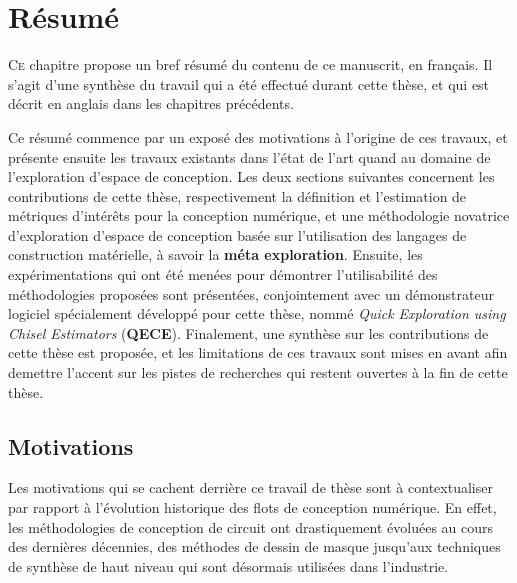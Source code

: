 \chapter{R\'esum\'e}


\lettrine[lines=2]{C}{e} chapitre propose un bref résumé du contenu de ce manuscrit, en français.
Il s'agit d'une synthèse du travail qui a été effectué durant cette thèse, et qui est décrit en anglais dans les chapitres précédents.

Ce résumé commence par un exposé des motivations à l'origine de ces travaux, et présente ensuite les travaux existants dans l'état de l'art quand au domaine de l'exploration d'espace de conception.
Les deux sections suivantes concernent les contributions de cette thèse, respectivement la définition et l'estimation de métriques d'intérêts pour la conception numérique, et une méthodologie novatrice d'exploration d'espace de conception basée sur l'utilisation des langages de construction matérielle, à savoir la {\bf méta exploration}.
Ensuite, les expérimentations qui ont été menées pour démontrer l'utilisabilité des méthodologies proposées sont présentées, conjointement avec un démonstrateur logiciel spécialement développé pour cette thèse, nommé {\it Quick Exploration using Chisel Estimators} ({\bf QECE}).
Finalement, une synthèse sur les contributions de cette thèse est proposée, et les limitations de ces travaux sont mises en avant afin demettre l'accent sur les pistes de recherches qui restent ouvertes à la fin de cette thèse.

\vspace*{\fill}
\minitoc 
\mtcskip 

\newpage

\section{Motivations}
\label{ch.resume:sec.motivations}
    Les motivations qui se cachent derrière ce travail de thèse sont à contextualiser par rapport à l'évolution historique des flots de conception numérique.
    En effet, les méthodologies de conception de circuit ont drastiquement évoluées au cours des dernières décennies, des méthodes de dessin de masque jusqu'aux techniques de synthèse de haut niveau qui sont désormais utilisées dans l'industrie.

